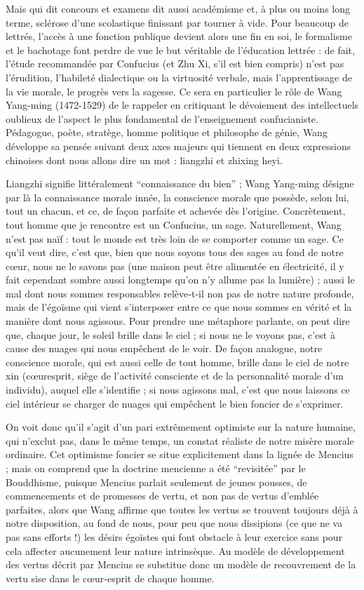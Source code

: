 Mais qui dit concours et examens dit aussi académisme et, à plus ou moins long terme,
sclérose d'une scolastique finissant par tourner à vide.
Pour beaucoup de lettrés, l'accès
à une fonction publique devient alors une fin en soi, le formalisme et le bachotage font
perdre de vue le but véritable de l'éducation lettrée : de fait, l'étude recommandée par
Confucius (et Zhu Xi, s'il est bien compris) n'est pas l'érudition, l'habileté dialectique
ou la virtuosité verbale, mais l'apprentissage de la vie morale, le progrès vers la sagesse.
Ce sera en particulier le rôle de Wang Yang-ming (1472-1529) de le rappeler en critiquant le dévoiement des intellectuels oublieux de l'aspect le plus fondamental de
l'enseignement confucianiste.
Pédagogue, poète, stratège, homme politique et philosophe de génie, Wang développe sa pensée suivant deux axes majeurs qui tiennent en
deux expressions chinoises dont nous allons dire un mot : liangzhi et zhixing heyi.

Liangzhi signifie littéralement ``connaissance du bien'' ; Wang Yang-ming désigne par
là la connaissance morale innée, la conscience morale que possède, selon lui, tout un
chacun, et ce, de façon parfaite et achevée dès l'origine.
Concrètement, tout homme que
je rencontre est un Confucius, un sage.
Naturellement, Wang n'est pas naïf : tout le
monde est très loin de se comporter comme un sage.
Ce qu'il veut dire, c'est que, bien
que nous soyons tous des sages au fond de notre cœur, nous ne le savons pas (une maison peut être alimentée en électricité, il y fait cependant sombre aussi longtemps qu'on
n'y allume pas la lumière) ; aussi le mal dont nous sommes responsables relève-t-il non
pas de notre nature profonde, mais de l'égoïsme qui vient s'interposer entre ce que nous
sommes en vérité et la manière dont nous agissons.
Pour prendre une métaphore parlante, on peut dire que, chaque jour, le soleil brille dans le ciel ; si nous ne le voyons pas,
c'est à cause des nuages qui nous empêchent de le voir.
De façon analogue, notre conscience morale, qui est aussi celle de tout homme, brille dans le ciel de notre xin (cœuresprit, siège de l'activité consciente et de la personnalité morale d'un individu), auquel
elle s'identifie ; si nous agissons mal, c'est que nous laissons ce ciel intérieur se charger
de nuages qui empêchent le bien foncier de s'exprimer.

On voit donc qu'il s'agit d'un pari extrêmement optimiste sur la nature humaine, qui
n'exclut pas, dans le même temps, un constat réaliste de notre misère morale ordinaire.
Cet optimisme foncier se situe explicitement dans la lignée de Mencius ; mais on comprend que la doctrine mencienne a été ``revisitée'' par le Bouddhisme, puisque Mencius
parlait seulement de jeunes pousses, de commencements et de promesses de vertu, et
non pas de vertus d'emblée parfaites, alors que Wang affirme que toutes les vertus se
trouvent toujours déjà à notre disposition, au fond de nous, pour peu que nous dissipions
(ce que ne va pas sans efforts !) les désirs égoïstes qui font obstacle à leur exercice sans
pour cela affecter aucunement leur nature intrinsèque.
Au modèle de développement des
vertus décrit par Mencius se substitue donc un modèle de recouvrement de la vertu sise
dans le cœur-esprit de chaque homme.

